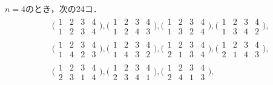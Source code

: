 \documentclass[11pt, a4paper, dvipdfmx]{jsarticle}
\theoremstyle{definition}
\theoremstyle{mystyle}
\numberwithin{equation}{section} %
\begin{document}
$n=4$のとき，次の24コ．
\begin{align*}
    &\Big(\begin{array}{cccc}
        1 & 2 & 3 & 4 \\
        1 & 2 & 3 & 4
    \end{array}\Big), 
    \Big(\begin{array}{cccc}
        1 & 2 & 3 & 4 \\
        1 & 2 & 4 & 3
    \end{array}\Big),
    \Big(\begin{array}{cccc}
        1 & 2 & 3 & 4 \\
        1 & 3 & 2 & 4
    \end{array}\Big), 
    \Big(\begin{array}{cccc}
        1 & 2 & 3 & 4 \\
        1 & 3 & 4 & 2
    \end{array}\Big),\\%
    &\Big(\begin{array}{cccc}
        1 & 2 & 3 & 4 \\
        1 & 4 & 2 & 3
    \end{array}\Big),
    \Big(\begin{array}{cccc}
        1 & 2 & 3 & 4 \\
        1 & 4 & 3 & 2
    \end{array}\Big), 
    \Big(\begin{array}{cccc}
        1 & 2 & 3 & 4 \\
        2 & 1 & 3 & 4
    \end{array}\Big), 
    \Big(\begin{array}{cccc}
        1 & 2 & 3 & 4 \\
        2 & 1 & 4 & 3
    \end{array}\Big), \\%
    &\Big(\begin{array}{cccc}
        1 & 2 & 3 & 4 \\
        2 & 3 & 1 & 4
    \end{array}\Big), 
    \Big(\begin{array}{cccc}
        1 & 2 & 3 & 4 \\
        2 & 3 & 4 & 1
    \end{array}\Big), 
    \Big(\begin{array}{cccc}
        1 & 2 & 3 & 4 \\
        2 & 4 & 1 & 3
    \end{array}\Big),

\end{align*}
\end{document}
